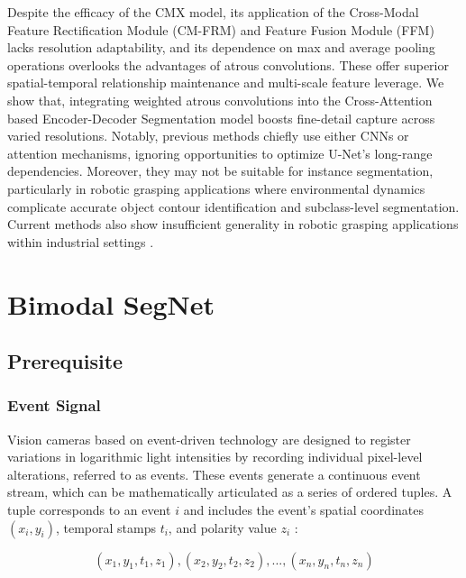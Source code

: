 \documentclass[lettersize,journal]{IEEEtran}
\begin{document}
Despite the efficacy of the CMX model, its application of the Cross-Modal Feature Rectification Module (CM-FRM) and Feature Fusion Module (FFM) lacks resolution adaptability, and its dependence on max and average pooling operations overlooks the advantages of atrous convolutions. These offer superior spatial-temporal relationship maintenance and multi-scale feature leverage. We show that, integrating weighted atrous convolutions into the Cross-Attention based Encoder-Decoder Segmentation model boosts fine-detail capture across varied resolutions. Notably, previous methods chiefly use either CNNs or attention mechanisms, ignoring opportunities to optimize U-Net's long-range dependencies. Moreover, they may not be suitable for instance segmentation, particularly in robotic grasping applications where environmental dynamics complicate accurate object contour identification and subclass-level segmentation. Current methods also show insufficient generality in robotic grasping applications within industrial settings \cite{Hua2023DynamicTransmission, Karthik2022Contour-enhancedSegmentation, Wang2021EFNet:Segmentation}.











\section{{Bimodal SegNet}}
\label{section : Methodology}

\subsection{Prerequisite}
\subsubsection{\textbf{Event Signal}}
Vision cameras based on event-driven technology are designed to register variations in logarithmic light intensities by recording individual pixel-level alterations, referred to as events. These events generate a continuous event stream, which can be mathematically articulated as a series of ordered tuples. A tuple corresponds to an event $i$ and includes the event's spatial coordinates $(x_i, y_i)$, temporal stamps $t_i$, and polarity value $z_i$ \cite{BaghaeiNaeini2020AApplications}: 
    
\begin{equation}
    {(x_1, y_1, t_1, z_1), (x_2, y_2, t_2, z_2), ..., (x_n, y_n, t_n, z_n)}
\end{equation}
\end{document}
